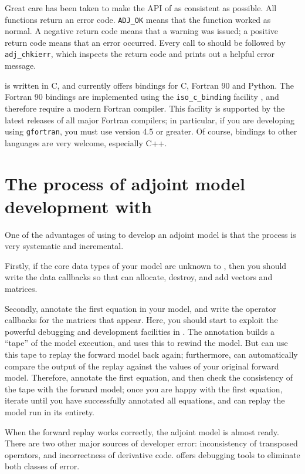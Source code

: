 Great care has been taken to make the API of \libadjoint as consistent as possible. All functions
return an error code. \texttt{ADJ_OK} means that the function worked as normal. A negative
return code means that a warning was issued; a positive return code means that an error occurred.
Every call to \libadjoint should be followed by \texttt{adj_chkierr}, which inspects the return
code and prints out a helpful error message.

\libadjoint is written in C, and currently offers bindings for C, Fortran 90 and Python. The Fortran 90 bindings
are implemented using the \texttt{iso_c_binding} facility \citep{metcalf2004}, and therefore require a modern
Fortran compiler. This facility is supported by the latest releases of all major Fortran compilers; in particular,
if you are developing using \texttt{gfortran}, you must use version 4.5 or greater.
Of course, bindings to other languages are very welcome, especially C++.

\section{The process of adjoint model development with \libadjoint}
One of the advantages of using \libadjoint to develop an adjoint model is that the process
is very systematic and incremental. 

Firstly, if the core data types of your model are unknown to \libadjoint, then you
should write the data callbacks so that \libadjoint can allocate, destroy, and add
vectors and matrices.

Secondly, annotate the first equation in your model, and write the operator
callbacks for the matrices that appear. Here, you should start to
exploit the powerful debugging and development facilities in \libadjoint. The
annotation builds a ``tape'' of the model execution, and \libadjoint uses this
to rewind the model. But \libadjoint can use this tape to replay the forward
model back again; furthermore, \libadjoint can automatically compare the output
of the replay against the values of your original forward model. Therefore,
annotate the first equation, and then check the consistency of the tape with the
forward model; once you are happy with the first equation, iterate until you have
successfully annotated all equations, and can replay the model run in its
entirety.

When the forward replay works correctly, the adjoint model is almost ready.
There are two other major sources of developer error: inconsistency of
transposed operators, and incorrectness of derivative code. \libadjoint
offers debugging tools to eliminate both classes of error. 

